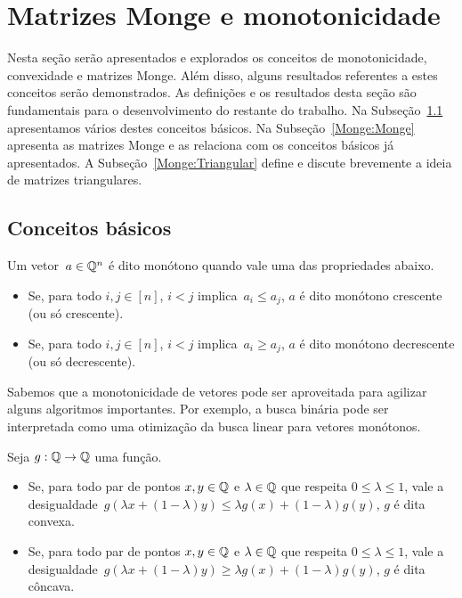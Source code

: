 \chapter{Matrizes Monge e monotonicidade}
\label{Monge}


Nesta seção serão apresentados e explorados os conceitos de monotonicidade, convexidade e matrizes Monge. Além disso, alguns resultados referentes a estes conceitos serão demonstrados. As definições e os resultados desta seção são fundamentais para o desenvolvimento do restante do trabalho.  Na Subseção~\ref{Monge:Basic} apresentamos vários destes conceitos básicos. Na Subseção~\ref{Monge:Monge} apresenta as matrizes Monge e as relaciona com os conceitos básicos já apresentados. A Subseção~\ref{Monge:Triangular} define e discute brevemente a ideia de matrizes triangulares.


\section{Conceitos básicos} \label{Monge:Basic}

\begin{defi}
Um vetor~${ a \in \mathbb{Q}^n }$ é dito monótono quando vale uma das propriedades abaixo.
\begin{itemize}
    \item Se, para todo $i,j \in [n]$, $i < j$ implica~$a_i \leq a_j$, $a$ é dito monótono crescente (ou só crescente).
    \item Se, para todo $i,j \in [n]$, $i < j$ implica~$a_i \geq a_j$, $a$ é dito monótono decrescente (ou só decrescente).
\end{itemize}
\end{defi}

Sabemos que a monotonicidade de vetores pode ser aproveitada para agilizar alguns algoritmos importantes. Por exemplo, a busca binária pode ser interpretada como uma otimização da busca linear para vetores monótonos. 

\begin{defi}
Seja $g : \mathbb{Q} \to \mathbb{Q}$ uma função.
\begin{itemize}
    \item Se, para todo par de pontos $x,y \in \mathbb{Q}$ e $\lambda \in \mathbb{Q}$ que respeita $0 \leq \lambda \leq 1$, vale a desigualdade~${g(\lambda x + (1 - \lambda)y) \leq \lambda g(x) + (1 - \lambda) g(y)}$, $g$ é dita convexa.
    \item Se, para todo par de pontos $x,y \in \mathbb{Q}$ e $\lambda \in \mathbb{Q}$ que respeita $0 \leq \lambda \leq 1$, vale a desigualdade~${g(\lambda x + (1 - \lambda)y) \geq \lambda g(x) + (1 - \lambda) g(y)}$, $g$ é dita côncava.
\end{itemize}
\end{defi}

